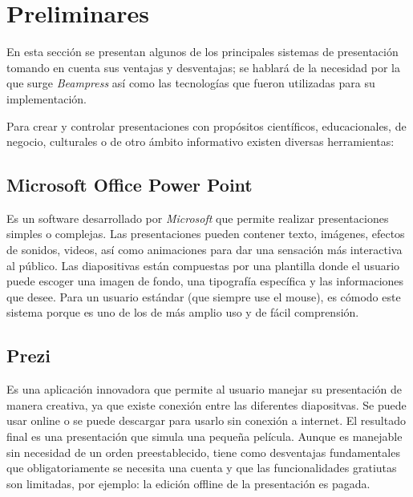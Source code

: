 \chapter{Preliminares} %
\label{cha:preliminares}
	En esta sección se presentan algunos de los principales sistemas de presentación tomando en cuenta sus ventajas y desventajas; se hablará de la necesidad por la que surge \textit{Beampress} así como las tecnologías que fueron utilizadas para su implementación.


	Para crear y controlar presentaciones con propósitos científicos, educacionales, de negocio, culturales o de otro ámbito informativo existen diversas herramientas:	

	\section*{Microsoft Office Power Point} %
	\label{sec:microsoft_office_power_point}

		Es un software desarrollado por \textit{Microsoft}  que permite realizar presentaciones simples o complejas. Las presentaciones pueden contener texto, imágenes, efectos de sonidos, videos, así como animaciones para dar una sensación más interactiva al público. Las diapositivas están compuestas por una plantilla donde el usuario puede escoger una imagen de fondo, una tipografía específica y las informaciones que desee. Para un usuario estándar (que siempre use el mouse), es cómodo este sistema porque es uno de los de más amplio uso y de fácil comprensión.


	\section*{Prezi} %
	\label{sec:prezi}

		Es una aplicación innovadora que permite al usuario manejar su presentación de manera creativa, ya que existe conexión entre las diferentes diapositvas. Se puede usar online o se puede descargar para usarlo sin conexión a internet. El resultado final es una presentación que simula una pequeña película. Aunque es manejable sin necesidad de un orden preestablecido, tiene como desventajas fundamentales que obligatoriamente se necesita una cuenta y que las funcionalidades gratiutas son limitadas, por ejemplo: la edición offline de la presentación es pagada.		

